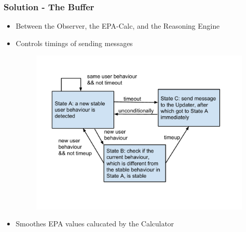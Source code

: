 \documentclass{beamer}
\begin{document}
\begin{frame}
\frametitle{Solution - The Buffer}
\begin{itemize}
\item Between the Observer, the EPA-Calc, and the Reasoning Engine
\pause \item Controls timings of sending messages
\begin{figure}
\centering
\includegraphics[trim = 10mm 25mm 16mm 15mm, clip, width=0.75\linewidth]{fig/fig-state-trans.pdf}
\end{figure}
\pause \item Smoothes EPA values calucated by the Calculator
\end{itemize}
\end{frame}

\end{document}
